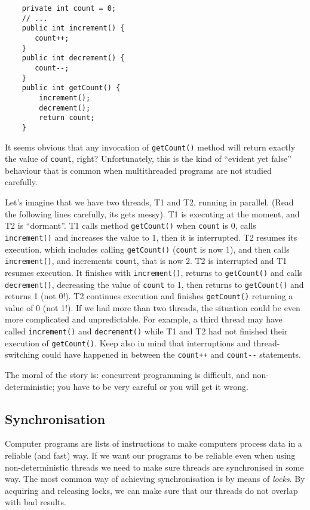 \begin{verbatim}
    private int count = 0;
    // ...
    public int increment() {
       count++;
    }
    public int decrement() {
       count--;
    }
    public int getCount() {
        increment();
        decrement();
        return count;
    }
\end{verbatim}

It seems obvious that any invocation of \verb+getCount()+ method will return
exactly the value of \verb+count+, right?
Unfortunately, this is the kind of ``evident yet false'' behaviour
that is common when multithreaded programs are not studied carefully. 

Let's imagine that we have two threads, T1 and T2, running in
parallel. (Read the following lines carefully, its gets messy). 
%
T1 is executing at the moment, and T2 is ``dormant''. 
%
T1 calls method \verb+getCount()+ when \verb+count+ is 0, calls
\verb+increment()+ and increases the value to 1, 
then it is interrupted. 
%
T2 resumes its execution, which includes
calling \verb+getCount()+ (\verb+count+ is now 1), and then calls
\verb+increment()+, and increments \verb+count+, that is now 2. 
% 
T2 is interrupted and T1 resumes execution. It finishes with
\verb+increment()+, returns to \verb+getCount()+ and calls
\verb+decrement()+, decreasing the value of \verb+count+ to 1, then
returns to \verb+getCount()+ and returns 1 (not 0!). 
%
T2 continues execution and finishes \verb+getCount()+ returning a
value of 0 (not 1!).
%
If we had more than two threads, the situation could be even more
complicated and unpredictable. For example, a third thread may have called
\verb+increment()+ and \verb+decrement()+ while T1 and T2 had not
finished their execution of \verb+getCount()+. 
%
Keep also in mind that interruptions and thread-switching
could have happened in between the \verb_count++_ and \verb+count--+
statements.

The moral of the story is: concurrent programming is difficult, and
non-deterministic; you have to be very careful or you will get it
wrong. 

\subsection{Synchronisation}
\label{sec:synchronization}

Computer programs are lists of instructions to make computers process data in a
reliable (and fast) way. If we want our programs to be reliable even
when using non-deterministic threads we need to make sure threads are
synchronised in some way. The most common way of achieving
synchronisation is by means of \emph{locks}. By acquiring and
releasing locks, we can make sure that our threads do not overlap
with bad results. 

